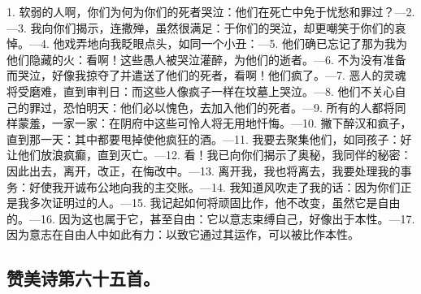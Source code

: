 1. 软弱的人啊，你们为何为你们的死者哭泣：他们在死亡中免于忧愁和罪过？—\newline{}2. —\newline{}3. 我向你们揭示，连撒殚，虽然很满足：于你们的哭泣，却更嘲笑于你们的哀悼。—\newline{}4. 他戏弄地向我眨眼点头，如同一个小丑：—\newline{}5. 他们确已忘记了那为我为他们隐藏的火：看啊！这些愚人被哭泣灌醉，为他们的逝者。—\newline{}6. 不为没有准备而哭泣，好像我掠夺了并遣送了他们的死者，看啊！他们疯了。—\newline{}7. 恶人的灵魂将受磨难，直到审判日：而这些人像疯子一样在坟墓上哭泣。—\newline{}8. 他们不关心自己的罪过，恐怕明天：他们必以愧色，去加入他们的死者。—\newline{}9. 所有的人都将同样蒙羞，一家一家：在阴府中这些可怜人将无用地忏悔。—\newline{}10. 撇下醉汉和疯子，直到那一天：其中都要甩掉使他疯狂的酒。—\newline{}11. 我要去聚集他们，如同孩子：好让他们放浪疯癫，直到灭亡。—\newline{}12. 看！我已向你们揭示了奥秘，我同伴的秘密：因此出去，离开，改正，在悔改中。—\newline{}13. 离开我，我也将离去，我要处理我的事务：好使我开诚布公地向我的主交账。—\newline{}14. 我知道风吹走了我的话：因为你们正是我多次证明过的人。—\newline{}15. 我记起如何将顽固比作，他不改变，虽然它是自由的。—\newline{}16. 因为这也属于它，甚至自由：它以意志束缚自己，好像出于本性。—\newline{}17. 因为意志在自由人中如此有力：以致它通过其运作，可以被比作本性。\par


\subsection{赞美诗第六十五首。}


